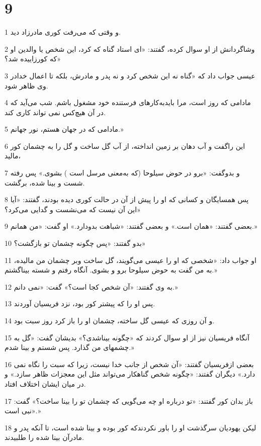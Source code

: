 \chapter{9}

\par 1 و وقتی که می‌رفت کوری مادرزاد دید.
\par 2 وشاگردانش از او سوال کرده، گفتند: «ای استاد گناه که کرد، این شخص یا والدین او که کورزاییده شد؟»
\par 3 عیسی جواب داد که «گناه نه این شخص کرد و نه پدر و مادرش، بلکه تا اعمال خدادر وی ظاهر شود.
\par 4 مادامی که روز است، مرا بایدبه‌کارهای فرستنده خود مشغول باشم. شب می‌آید که در آن هیچ‌کس نمی تواند کاری کند.
\par 5 مادامی که در جهان هستم، نور جهانم.»
\par 6 این راگفت و آب دهان بر زمین انداخته، از آب گل ساخت و گل را به چشمان کور مالید،
\par 7 و بدوگفت: «برو در حوض سیلوحا (که به‌معنی مرسل است ) بشوی.» پس رفته شست و بینا شده، برگشت.
\par 8 پس همسایگان و کسانی که او را پیش از آن در حالت کوری دیده بودند، گفتند: «آیا این آن نیست که می‌نشست و گدایی می‌کرد؟»
\par 9 بعضی گفتند: «همان است.» و بعضی گفتند: «شباهت بدودارد.» او گفت: «من همانم.»
\par 10 بدو گفتند: «پس چگونه چشمان تو بازگشت؟»
\par 11 او جواب داد: «شخصی که او را عیسی می‌گویند، گل ساخت وبر چشمان من مالیده، به من گفت به حوض سیلوحا برو و بشوی. آنگاه رفتم و شسته بیناگشتم.»
\par 12 به وی گفتند: «آن شخص کجا است؟» گفت: «نمی دانم.»
\par 13 پس او را که پیشتر کور بود، نزد فریسیان آوردند.
\par 14 و آن روزی که عیسی گل ساخته، چشمان او را باز کرد روز سبت بود.
\par 15 آنگاه فریسیان نیز از او سوال کردند که «چگونه بیناشدی؟» بدیشان گفت: «گل به چشمهای من گذارد. پس شستم و بینا شدم.»
\par 16 بعضی ازفریسیان گفتند: «آن شخص از جانب خدا نیست، زیرا که سبت را نگاه نمی دارد.» دیگران گفتند: «چگونه شخص گناهکار می‌تواند مثل این معجزات ظاهر سازد.» و در میان ایشان اختلاف افتاد.
\par 17 باز بدان کور گفتند: «تو درباره او چه می‌گویی که چشمان تو را بینا ساخت؟» گفت: «نبی است.»
\par 18 لیکن یهودیان سرگذشت او را باور نکردندکه کور بوده و بینا شده است، تا آنکه پدر و مادرآن بینا شده را طلبیدند.
